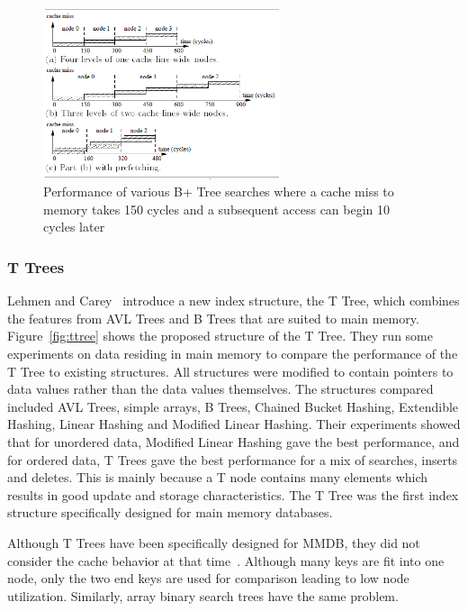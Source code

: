 \documentclass[12pt,a4paper]{article}
\begin{document}
\begin{figure}[!t]
\centering
\includegraphics[width=7cm]{figs/prefetching.png}
\caption{Performance of various B+ Tree searches where a cache miss to memory takes 150 cycles and a subsequent access can begin 10 cycles
later~\cite{chen2001improving}}
\label{fig:prefetching}
\end{figure}

\subsubsection*{T Trees}
Lehmen and Carey~\cite{lehman1986study} introduce a new index structure, the T Tree, which combines the features from AVL Trees and B Trees that are suited to
main memory. Figure~\ref{fig:ttree} shows the proposed structure of the T Tree. They run some experiments on data residing in main memory to compare the
performance of the T
Tree to existing structures. All structures were modified to contain pointers to data values rather than the data values themselves. The structures
compared included  AVL Trees, simple arrays, B Trees, Chained Bucket Hashing, Extendible Hashing, Linear Hashing and Modified Linear Hashing. Their
experiments showed that for unordered data, Modified Linear Hashing gave the best performance, and for ordered data, T Trees gave the best performance for a mix
of searches, inserts and deletes. This is mainly because a T node contains many elements which results in good update and storage characteristics. The T Tree
was the first index structure specifically designed for main memory databases.

Although T Trees have been specifically designed for MMDB, they did not consider the cache behavior at that time~\cite{rao1999cache}. Although many keys are
fit into one node, only the two end keys are used for comparison leading to low node utilization. Similarly, array binary search trees have the same problem. 
\end{document}
